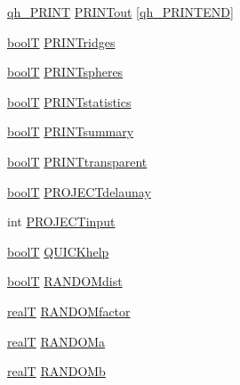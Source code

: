 \begin{DoxyCompactItemize}
\item 
\hyperlink{libqhull_8h_a2e3cd31bc028762f1c38935045f6c707}{qh\+\_\+\+P\+R\+I\+N\+T} \hyperlink{structqhT_a452abc5bef933d9df0891c0adcbd9e1b}{P\+R\+I\+N\+Tout} \mbox{[}\hyperlink{libqhull_8h_a2e3cd31bc028762f1c38935045f6c707acf2fc06ec4558d19401d67bf53dfbf52}{qh\+\_\+\+P\+R\+I\+N\+T\+E\+N\+D}\mbox{]}
\item 
\hyperlink{libqhull_8h_ab1a924b550e00cabe8c367e76b207ea5}{bool\+T} \hyperlink{structqhT_aa467993e1be4d0501aa5c3187768bf6f}{P\+R\+I\+N\+Tridges}
\item 
\hyperlink{libqhull_8h_ab1a924b550e00cabe8c367e76b207ea5}{bool\+T} \hyperlink{structqhT_a5cf35ea197b7e762702be5b65cd52b88}{P\+R\+I\+N\+Tspheres}
\item 
\hyperlink{libqhull_8h_ab1a924b550e00cabe8c367e76b207ea5}{bool\+T} \hyperlink{structqhT_ae3d5201094cada07f8a252b89865689e}{P\+R\+I\+N\+Tstatistics}
\item 
\hyperlink{libqhull_8h_ab1a924b550e00cabe8c367e76b207ea5}{bool\+T} \hyperlink{structqhT_a73dd2e93f42fb7b2dc0604827d5dd8a3}{P\+R\+I\+N\+Tsummary}
\item 
\hyperlink{libqhull_8h_ab1a924b550e00cabe8c367e76b207ea5}{bool\+T} \hyperlink{structqhT_aae1e48ac5532a888ece28d3bfab4dab4}{P\+R\+I\+N\+Ttransparent}
\item 
\hyperlink{libqhull_8h_ab1a924b550e00cabe8c367e76b207ea5}{bool\+T} \hyperlink{structqhT_a399b1b580d96bb8b5477e30ffa2f10c6}{P\+R\+O\+J\+E\+C\+Tdelaunay}
\item 
int \hyperlink{structqhT_a8f82252a1e0413348daef514b138cd34}{P\+R\+O\+J\+E\+C\+Tinput}
\item 
\hyperlink{libqhull_8h_ab1a924b550e00cabe8c367e76b207ea5}{bool\+T} \hyperlink{structqhT_aa33fd3293a410673dcfa839755f770d0}{Q\+U\+I\+C\+Khelp}
\item 
\hyperlink{libqhull_8h_ab1a924b550e00cabe8c367e76b207ea5}{bool\+T} \hyperlink{structqhT_a3efd2f9c6e757f2babc5372c30d455be}{R\+A\+N\+D\+O\+Mdist}
\item 
\hyperlink{user_8h_ad6fe71dff955732ea8682263e9540bb7}{real\+T} \hyperlink{structqhT_aa53adfac93d1d6938fef37164b4ed28b}{R\+A\+N\+D\+O\+Mfactor}
\item 
\hyperlink{user_8h_ad6fe71dff955732ea8682263e9540bb7}{real\+T} \hyperlink{structqhT_adb5a233fbf57274baf76df3279fef164}{R\+A\+N\+D\+O\+Ma}
\item 
\hyperlink{user_8h_ad6fe71dff955732ea8682263e9540bb7}{real\+T} \hyperlink{structqhT_af6f54e31f4f874c63645e2ddcf8b5ba9}{R\+A\+N\+D\+O\+Mb}
\item 

\end{DoxyCompactItemize}
